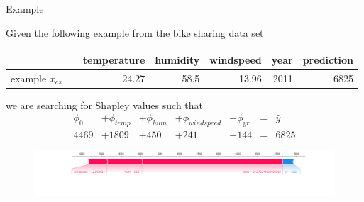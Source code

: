 \documentclass[11pt,compress,t,notes=noshow, aspectratio=169, xcolor=table]{beamer}
\begin{document}
\begin{vbframe}{Example}

Given the following example from the bike sharing data set

\begin{table}[h]
\centering
\begin{tabular}{l rrrrr || r}
  \hline
  && temperature & humidity & windspeed & year & prediction\\ 
  \hline
 example $x_{ex}$ && 24.27 & 58.5 & 13.96 & 2011 & 6825 \\ 
 \hline
\end{tabular}
\end{table}

we are searching for Shapley values such that
\begin{equation}
\begin{array}{lllllcr}
\phi_0 &+ \phi_{temp} &+ \phi_{hum} &+ \phi_{windspeed} &+ \phi_{yr} & = &\hat{y} \\
4469 &+ 1809 &+ 450 &+ 241 &- 144 & = & 6825
\end{array}
\end{equation}

\begin{figure}
    \centering
    \includegraphics[width=\columnwidth]{slides/shapley/figure_man/exSHAP.png}
\end{figure}
\end{vbframe}
\end{document}
